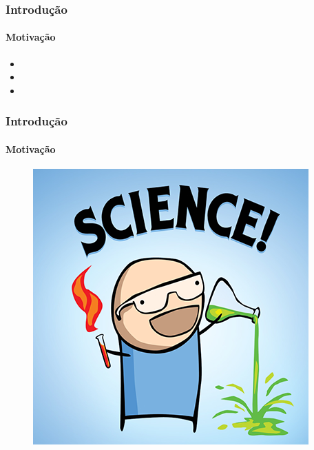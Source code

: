 \begin{frame}
\frametitle{Introdução}
    \framesubtitle{Motivação}
        
        \begin{itemize}[<+->]
            \item \myliplip
            \item \myblabla
            \item \myliplip
        \end{itemize}
\end{frame}

\begin{frame}
    \frametitle{Introdução}
        \framesubtitle{Motivação}
            \begin{figure}
                \centering
                \begin{minipage}{.5\textwidth}
                    \centering
                    \includegraphics[width=0.85\linewidth]{figures/science.png}
                \end{minipage}%
                \begin{minipage}{.5\textwidth}
                    \centering

\end{minipage}
\end{figure}
\end{frame}
